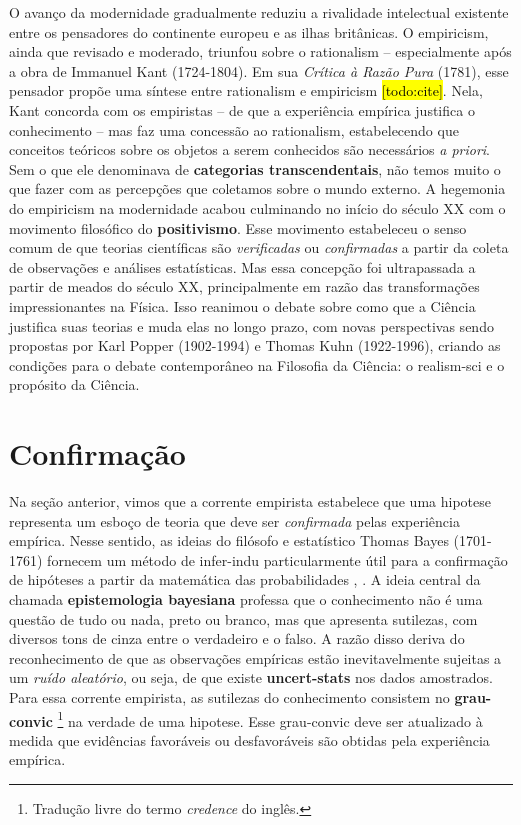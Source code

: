 \documentclass[./main.tex]{subfiles}
\begin{document}
\par O avanço da modernidade gradualmente reduziu a rivalidade intelectual existente entre os pensadores do continente europeu e as ilhas britânicas. O \gls{empiricism}, ainda que revisado e moderado, triunfou sobre o \gls{rationalism} -- especialmente após a obra de Immanuel Kant (1724-1804). Em sua \textit{Crítica à Razão Pura} (1781), esse pensador propõe uma síntese entre \gls{rationalism} e \gls{empiricism} \hl{[todo:cite]}. Nela, Kant concorda com os empiristas -- de que a experiência empírica justifica o conhecimento -- mas faz uma concessão ao \gls{rationalism}, estabelecendo que conceitos teóricos sobre os objetos a serem conhecidos são necessários \textit{a priori}. Sem o que ele denominava de \textbf{categorias transcendentais}, não temos muito o que fazer com as percepções que coletamos sobre o mundo externo. A hegemonia do \gls{empiricism} na modernidade  acabou culminando no início do século XX com o movimento filosófico do \textbf{\gls{positivismo}}. Esse movimento estabeleceu o senso comum de que teorias científicas são \textit{verificadas} ou \textit{confirmadas} a partir da coleta de observações e análises estatísticas. Mas essa concepção foi ultrapassada a partir de meados do século XX, principalmente em razão das transformações impressionantes na Física. Isso reanimou o debate sobre como que a Ciência justifica suas teorias e muda elas no longo prazo, com novas perspectivas sendo propostas por Karl Popper (1902-1994) e Thomas Kuhn (1922-1996), criando as condições para o debate contemporâneo na Filosofia da Ciência: o \gls{realism-sci} e o propósito da Ciência.

\section{Confirmação} \label{sec:epis:bayes}

\par Na seção anterior, vimos que a corrente empirista estabelece que uma \gls{hipotese} representa um esboço de \gls{teoria} que deve ser \textit{confirmada} pelas experiência empírica. Nesse sentido, as ideias do filósofo e estatístico Thomas Bayes (1701-1761) fornecem um método de \gls{infer-indu} particularmente útil para a confirmação de hipóteses a partir da matemática das probabilidades \cite{sep-epistemology-bayesian}, \cite{sprenger2019}. A ideia central da chamada \textbf{epistemologia bayesiana} professa que o conhecimento não é uma questão de tudo ou nada, preto ou branco, mas que apresenta sutilezas, com diversos tons de cinza entre o verdadeiro e o falso. A razão disso deriva do reconhecimento de que as observações empíricas estão inevitavelmente sujeitas a um \textit{ruído aleatório}, ou seja, de que existe \textbf{\gls{uncert-stats}} nos dados amostrados. Para essa corrente empirista, as sutilezas do conhecimento consistem no \textbf{\gls{grau-convic}} \footnote{Tradução livre do termo \textit{credence} do inglês.} na verdade de uma \gls{hipotese}. Esse \gls{grau-convic} deve ser atualizado à medida que evidências favoráveis ou desfavoráveis são obtidas pela experiência empírica. 
\end{document}
